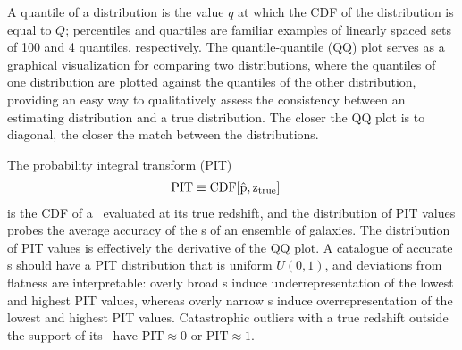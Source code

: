 A quantile of a distribution is the value $q$ at which the CDF of the distribution is equal to $Q$; percentiles and quartiles are familiar examples of linearly spaced sets of 100 and 4 quantiles, respectively.
The quantile-quantile (QQ) plot serves as a graphical visualization for comparing two distributions, where the quantiles of one distribution are plotted against the quantiles of the other distribution,
providing an easy way to qualitatively assess the consistency between an estimating distribution and a true distribution.
The closer the QQ plot is to diagonal, the closer the match between the distributions.

The probability integral transform (PIT)
\begin{align}
\label{eq:pit}
\mathrm{PIT} &\equiv \rm{CDF}[\hat{p}, z_{\rm true}] %
\end{align}
is the CDF of a \pzpdf\ evaluated at its true redshift, and the distribution of PIT values probes the average accuracy of the \pzpdf s of an ensemble of galaxies.
The distribution of PIT values is effectively the derivative of the QQ plot.
A catalogue of accurate \pzpdf s should have a PIT distribution that is uniform $U(0,1)$, and deviations from flatness are interpretable: overly broad \pzpdf s induce underrepresentation of the lowest and highest PIT values, whereas overly narrow \pzpdf s induce overrepresentation of the lowest and highest PIT values.
Catastrophic outliers with a true redshift outside the support of its \pzpdf\ have $\mathrm{PIT} \approx 0$ or $\mathrm{PIT} \approx 1$.

